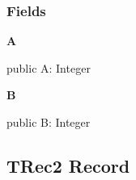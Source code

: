\documentclass{report}
\newif\ifpdf
\begin{document}
\subsubsection*{\large{\textbf{Fields}}\normalsize\hspace{1ex}\hfill}
\begin{list}{}{
\setlength{\itemindent}{0cm}
\setlength{\listparindent}{0cm}
\setlength{\leftmargin}{\evensidemargin}
\addtolength{\leftmargin}{\tmplength}
\settowidth{\labelsep}{X}
\addtolength{\leftmargin}{\labelsep}
\setlength{\labelwidth}{\tmplength}
}
\label{ok_record_case_parsing.TRec1-A}
\item[\textbf{A}\hfill]
\ifpdf
\begin{flushleft}
\fi
\begin{ttfamily}
public A: Integer\end{ttfamily}

\ifpdf
\end{flushleft}
\fi


\par  \label{ok_record_case_parsing.TRec1-B}
\item[\textbf{B}\hfill]
\ifpdf
\begin{flushleft}
\fi
\begin{ttfamily}
public B: Integer\end{ttfamily}

\ifpdf
\end{flushleft}
\fi


\par  \end{list}
\ifpdf
\subsection*{\large{\textbf{TRec2 Record}}\normalsize\hspace{1ex}\hrulefill}
\else
\subsection*{TRec2 Record}
\fi
\label{ok_record_case_parsing.TRec2}
\end{document}

